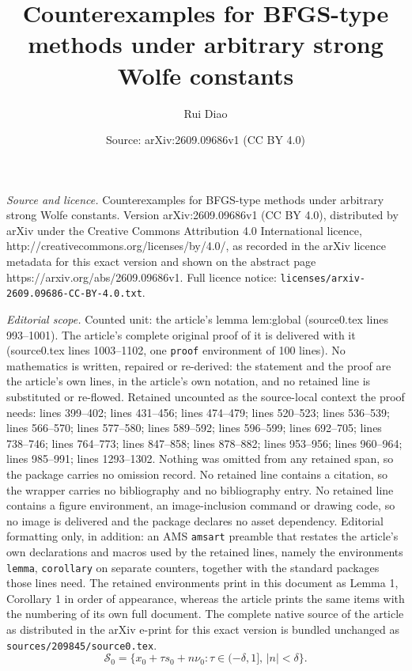 \documentclass[10pt,a4paper]{amsart}
\title{Counterexamples for {BFGS}-type methods under arbitrary strong {Wolfe} constants}
\author{Rui Diao}
\date{Source: arXiv:2609.09686v1 (CC BY 4.0)}
\begin{document}
\maketitle

\noindent\emph{Source and licence.} Counterexamples for {BFGS}-type methods under arbitrary strong {Wolfe} constants. Version arXiv:2609.09686v1 (CC BY 4.0), distributed by arXiv under the Creative Commons Attribution 4.0 International licence, http://creativecommons.org/licenses/by/4.0/, as recorded in the arXiv licence metadata for this exact version and shown on the abstract page https://arxiv.org/abs/2609.09686v1. Full licence notice: \texttt{licenses/arxiv-2609.09686-CC-BY-4.0.txt}.\par\smallskip

\noindent\textit{Editorial scope.} Counted unit: the article's lemma lem:global (source0.tex lines 993--1001). The article's complete original proof of it is delivered with it (source0.tex lines 1003--1102, one \texttt{proof} environment of 100 lines). No mathematics is written, repaired or re-derived: the statement and the proof are the article's own lines, in the article's own notation, and no retained line is substituted or re-flowed.  Retained uncounted as the source-local context the proof needs: lines 399--402; lines 431--456; lines 474--479; lines 520--523; lines 536--539; lines 566--570; lines 577--580; lines 589--592; lines 596--599; lines 692--705; lines 738--746; lines 764--773; lines 847--858; lines 878--882; lines 953--956; lines 960--964; lines 985--991; lines 1293--1302.  Nothing was omitted from any retained span, so the package carries no omission record.  No retained line contains a citation, so the wrapper carries no bibliography and no bibliography entry.  No retained line contains a figure environment, an image-inclusion command or drawing code, so no image is delivered and the package declares no asset dependency.  Editorial formatting only, in addition: an AMS \texttt{amsart} preamble that restates the article's own declarations and macros used by the retained lines, namely the environments \texttt{lemma}, \texttt{corollary} on separate counters, together with the standard packages those lines need.  The retained environments print in this document as Lemma 1, Corollary 1 in order of appearance, whereas the article prints the same items with the numbering of its own full document.  The complete native source of the article as distributed in the arXiv e-print for this exact version is bundled unchanged as \texttt{sources/209845/source0.tex}.
\begin{equation}
\label{eq:S0}
\mathcal S_0 = \{x_0 + \tau s_0 + n\nu_0 : \tau \in (-\delta, 1],\, |n| < \delta\}.
\end{equation}
\end{document}
